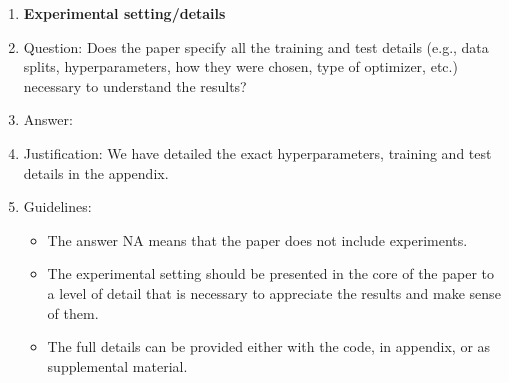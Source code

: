 \documentclass{article}
\theoremstyle{plain}
\theoremstyle{definition}
\theoremstyle{remark}
\begin{document}
\begin{enumerate}
\item {\bf Experimental setting/details}
    \item[] Question: Does the paper specify all the training and test details (e.g., data splits, hyperparameters, how they were chosen, type of optimizer, etc.) necessary to understand the results?
    \item[] Answer: \answerYes{} %
    \item[] Justification: We have detailed the exact hyperparameters, training and test details in the appendix.
    \item[] Guidelines:
    \begin{itemize}
        \item The answer NA means that the paper does not include experiments.
        \item The experimental setting should be presented in the core of the paper to a level of detail that is necessary to appreciate the results and make sense of them.
        \item The full details can be provided either with the code, in appendix, or as supplemental material.
    \end{itemize}


\end{enumerate}
\end{document}
